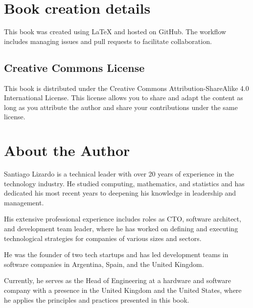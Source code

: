 \appendix
\section*{Book creation details}

This book was created using \LaTeX{} and hosted on GitHub. The workflow includes managing issues and pull requests to facilitate collaboration.

\subsection*{Creative Commons License}

This book is distributed under the Creative Commons Attribution-ShareAlike 4.0 International License. This license allows you to share and adapt the content as long as you attribute the author and share your contributions under the same license.

\section*{About the Author}

Santiago Lizardo is a technical leader with over 20 years of experience in the technology industry. He studied computing, mathematics, and statistics and has dedicated his most recent years to deepening his knowledge in leadership and management.

His extensive professional experience includes roles as CTO, software architect, and development team leader, where he has worked on defining and executing technological strategies for companies of various sizes and sectors.

He was the founder of two tech startups and has led development teams in software companies in Argentina, Spain, and the United Kingdom.

Currently, he serves as the Head of Engineering at a hardware and software company with a presence in the United Kingdom and the United States, where he applies the principles and practices presented in this book.
